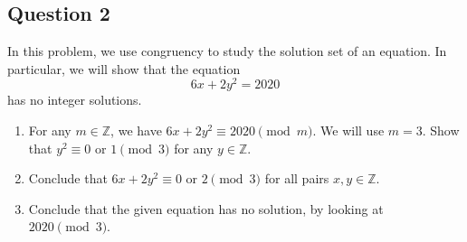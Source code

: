 \documentclass{article}
\begin{document}
\subsection*{Question 2}
    In this problem, we use congruency to study the solution set of an equation. In particular, we will show that the equation $$6x + 2y^{2} = 2020$$ has no integer solutions.
    \begin{enumerate}
        \item For any $m \in \mathbb{Z}$, we have $6x + 2y^2 \equiv 2020 \pmod{m}$. We will use $m = 3$. Show that $y^{2} \equiv 0$ or $1 \pmod{3}$ for any $y \in \mathbb{Z}$.
        \item Conclude that $6x + 2y^2 \equiv 0$ or $2 \pmod{3}$ for all pairs $x, y \in \mathbb{Z}$.
        \item Conclude that the given equation has no solution, by looking at $2020 \pmod{3}$.
    \end{enumerate}
\end{document}

